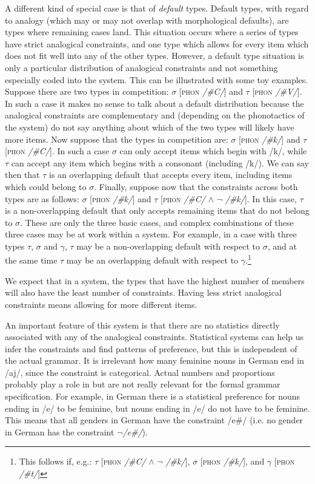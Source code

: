 A different kind of special case is that of \textit{default} types. Default types, with regard to analogy (which may or may not overlap with morphological defaults), are types where remaining cases land. This situation occurs where a series of types have strict analogical constraints, and one type which allows for every item which does not fit well into any of the other types. However, a default type situation is only a particular distribution of analogical constraints and not something especially coded into the system. This can be illustrated with some toy examples. Suppose there are two types in competition: $\sigma$ [\textsc{phon} \textit{/\#C/}] and $\tau$ [\textsc{phon} \textit{/\#V/}]. In such a case it makes no sense to talk about a default distribution because the analogical constraints are complementary and (depending on the phonotactics of the system) do not say anything about which of the two types will likely have more items. Now suppose that the types in competition are: $\sigma$ [\textsc{phon} \textit{/\#k/}] and $\tau$ [\textsc{phon} \textit{/\#C/}]. In such a case $\sigma$ can only accept items which begin with /k/, while $\tau$ can accept any item which begins with a consonant (including /k/). We can say then that $\tau$ is an overlapping default that accepts every item, including items which could belong to $\sigma$. Finally, suppose now that the constraints across both types are as follows: $\sigma$ [\textsc{phon} \textit{/\#k/}] and $\tau$ [\textsc{phon} \textit{/\#C/} $\land$ $\lnot$ \textit{/\#k/}]. In this case, $\tau$ is a non-overlapping default that only accepts remaining items that do not belong to $\sigma$. These are only the three basic cases, and complex combinations of these three cases may be at work within a system. For example, in a case with three types $\tau$, $\sigma$ and $\gamma$, $\tau$ may be a non-overlapping default with respect to $\sigma$, and at the same time $\tau$ may be an overlapping default with respect to $\gamma$.\footnote{This follows if, e.g.: $\tau$ [\textsc{phon} \textit{/\#C/} $\land$ $\lnot$ \textit{/\#k/}], $\sigma$ [\textsc{phon} \textit{/\#k/}], and $\gamma$ [\textsc{phon} \textit{/\#t/}]}

We expect that in a system, the types that have the highest number of members will also have the least number of constraints. Having less strict analogical constraints means allowing for more different items.

An important feature of this system is that there are no statistics directly associated with any of the analogical constraints. Statistical systems can help us infer the constraints and find patterns of preference, but this is independent of the actual grammar. It is irrelevant how many feminine nouns in German end in /aj/, since the constraint is categorical. Actual numbers and proportions probably play a role in  but are not really relevant for the formal grammar specification. For example, in German there is a statistical preference for nouns ending in /e/ to be feminine, but nouns ending in /e/ do not have to be feminine. This means that all genders in German have the constraint /e\#/ (i.e. no gender in German has the constraint \textit{$\lnot$/e\#/}).

